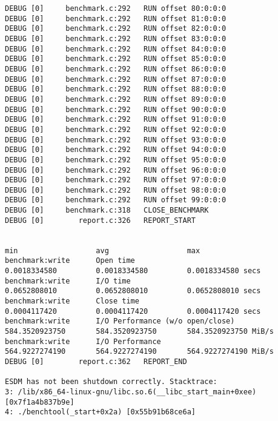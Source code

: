 \begin{verbatim}
DEBUG [0]     benchmark.c:292   RUN offset 80:0:0:0
DEBUG [0]     benchmark.c:292   RUN offset 81:0:0:0
DEBUG [0]     benchmark.c:292   RUN offset 82:0:0:0
DEBUG [0]     benchmark.c:292   RUN offset 83:0:0:0
DEBUG [0]     benchmark.c:292   RUN offset 84:0:0:0
DEBUG [0]     benchmark.c:292   RUN offset 85:0:0:0
DEBUG [0]     benchmark.c:292   RUN offset 86:0:0:0
DEBUG [0]     benchmark.c:292   RUN offset 87:0:0:0
DEBUG [0]     benchmark.c:292   RUN offset 88:0:0:0
DEBUG [0]     benchmark.c:292   RUN offset 89:0:0:0
DEBUG [0]     benchmark.c:292   RUN offset 90:0:0:0
DEBUG [0]     benchmark.c:292   RUN offset 91:0:0:0
DEBUG [0]     benchmark.c:292   RUN offset 92:0:0:0
DEBUG [0]     benchmark.c:292   RUN offset 93:0:0:0
DEBUG [0]     benchmark.c:292   RUN offset 94:0:0:0
DEBUG [0]     benchmark.c:292   RUN offset 95:0:0:0
DEBUG [0]     benchmark.c:292   RUN offset 96:0:0:0
DEBUG [0]     benchmark.c:292   RUN offset 97:0:0:0
DEBUG [0]     benchmark.c:292   RUN offset 98:0:0:0
DEBUG [0]     benchmark.c:292   RUN offset 99:0:0:0
DEBUG [0]     benchmark.c:318   CLOSE_BENCHMARK
DEBUG [0]        report.c:326   REPORT_START

                                                                               min                  avg                  max
benchmark:write      Open time                                        0.0018334580         0.0018334580         0.0018334580 secs
benchmark:write      I/O time                                         0.0652808010         0.0652808010         0.0652808010 secs
benchmark:write      Close time                                       0.0004117420         0.0004117420         0.0004117420 secs
benchmark:write      I/O Performance (w/o open/close)               584.3520923750       584.3520923750       584.3520923750 MiB/s
benchmark:write      I/O Performance                                564.9227274190       564.9227274190       564.9227274190 MiB/s
DEBUG [0]        report.c:362   REPORT_END

ESDM has not been shutdown correctly. Stacktrace:
3: /lib/x86_64-linux-gnu/libc.so.6(__libc_start_main+0xee) [0x7f1a4b837b9e]
4: ./benchtool(_start+0x2a) [0x55b91b68ce6a]
\end{verbatim}

